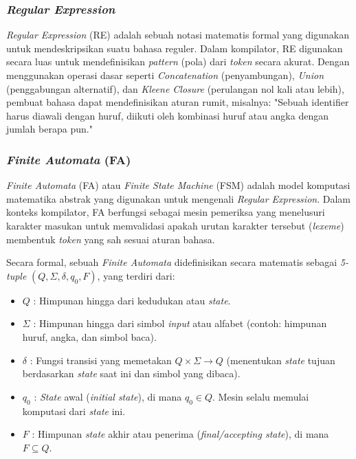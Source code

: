 \documentclass[12pt,a4paper]{article}
\begin{document}
\subsubsection{\textit{Regular Expression}}
\textit{Regular Expression} (RE) adalah sebuah notasi matematis formal yang
digunakan untuk mendeskripsikan suatu bahasa reguler. Dalam kompilator, RE
digunakan secara luas untuk mendefinisikan \textit{pattern} (pola) dari
\textit{token} secara akurat. Dengan menggunakan operasi dasar seperti
\textit{Concatenation} (penyambungan), \textit{Union} (penggabungan alternatif),
dan \textit{Kleene Closure} (perulangan nol kali atau lebih), pembuat bahasa
dapat mendefinisikan aturan rumit, misalnya: "Sebuah identifier harus diawali
dengan huruf, diikuti oleh kombinasi huruf atau angka dengan jumlah berapa pun."

\subsubsection{\textit{Finite Automata} (FA)}

\textit{Finite Automata} (FA) atau \textit{Finite State Machine} (FSM) adalah
model komputasi matematika abstrak yang digunakan untuk mengenali
\textit{Regular Expression}. Dalam konteks kompilator, FA berfungsi sebagai
mesin pemeriksa yang menelusuri karakter masukan untuk memvalidasi apakah urutan
karakter tersebut (\textit{lexeme}) membentuk \textit{token} yang sah sesuai
aturan bahasa.

Secara formal, sebuah \textit{Finite Automata} didefinisikan secara matematis
sebagai \textit{5-tuple} $(Q, \Sigma, \delta, q_0, F)$, yang terdiri dari:
\begin{itemize}
    \item $Q$ : Himpunan hingga dari kedudukan atau \textit{state}.
    \item $\Sigma$ : Himpunan hingga dari simbol \textit{input} atau alfabet
        (contoh: himpunan huruf, angka, dan simbol baca).
    \item $\delta$ : Fungsi transisi yang memetakan $Q \times \Sigma \rightarrow
        Q$ (menentukan \textit{state} tujuan berdasarkan \textit{state} saat ini dan simbol yang dibaca).
    \item $q_0$ : \textit{State} awal (\textit{initial state}), di mana $q_0 \in
        Q$. Mesin selalu memulai komputasi dari \textit{state} ini.
    \item $F$ : Himpunan \textit{state} akhir atau penerima
        (\textit{final/accepting state}), di mana $F \subseteq Q$.
\end{itemize}
\end{document}
